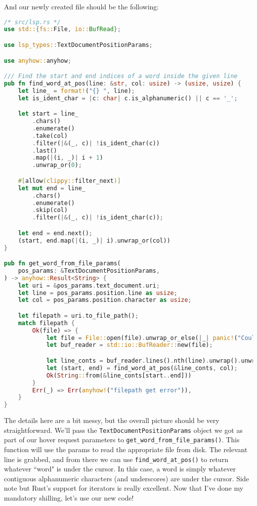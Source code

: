 And our newly created file should be the following:

\begin{lstlisting}[language=rust]
/* src/lsp.rs */
use std::{fs::File, io::BufRead};

use lsp_types::TextDocumentPositionParams;

use anyhow::anyhow;

/// Find the start and end indices of a word inside the given line
pub fn find_word_at_pos(line: &str, col: usize) -> (usize, usize) {
    let line_ = format!("{} ", line);
    let is_ident_char = |c: char| c.is_alphanumeric() || c == '_';

    let start = line_
        .chars()
        .enumerate()
        .take(col)
        .filter(|&(_, c)| !is_ident_char(c))
        .last()
        .map(|(i, _)| i + 1)
        .unwrap_or(0);

    #[allow(clippy::filter_next)]
    let mut end = line_
        .chars()
        .enumerate()
        .skip(col)
        .filter(|&(_, c)| !is_ident_char(c));

    let end = end.next();
    (start, end.map(|(i, _)| i).unwrap_or(col))
}

pub fn get_word_from_file_params(
    pos_params: &TextDocumentPositionParams,
) -> anyhow::Result<String> {
    let uri = &pos_params.text_document.uri;
    let line = pos_params.position.line as usize;
    let col = pos_params.position.character as usize;

    let filepath = uri.to_file_path();
    match filepath {
        Ok(file) => {
            let file = File::open(file).unwrap_or_else(|_| panic!("Couldn't open file -> {}", uri));
            let buf_reader = std::io::BufReader::new(file);

            let line_conts = buf_reader.lines().nth(line).unwrap().unwrap();
            let (start, end) = find_word_at_pos(&line_conts, col);
            Ok(String::from(&line_conts[start..end]))
        }
        Err(_) => Err(anyhow!("filepath get error")),
    }
}
\end{lstlisting}

The details here are a bit messy, but the overall picture should be very straightforward. We'll pass the \texttt{TextDocumentPositionParams} object we got as part of our hover request parameters to \texttt{get\_word\_from\_file\_params()}. This function will use the params to read the appropriate file from disk. The relevant line is grabbed, and from there we can use \texttt{find\_word\_at\_pos()} to return whatever ``word" is under the cursor. In this case, a word is simply whatever contiguous alphanumeric characters (and underscores) are under the cursor. Side note but Rust's support for iterators is really excellent. Now that I've done my mandatory shilling, let's use our new code!

